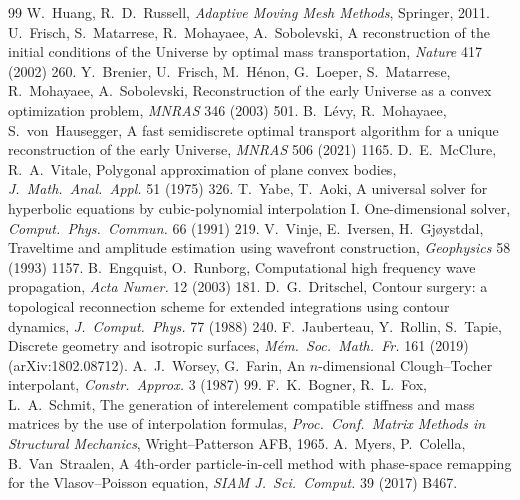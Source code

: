 \documentclass[11pt,a4paper]{article}
\numberwithin{equation}{section}
\theoremstyle{definition}
\theoremstyle{remark}
\begin{document}
\begin{thebibliography}{99}
 W.~Huang, R.~D.~Russell, \emph{Adaptive Moving Mesh Methods}, Springer, 2011.
 U.~Frisch, S.~Matarrese, R.~Mohayaee, A.~Sobolevski, A reconstruction of the initial conditions of the Universe by optimal mass transportation, \emph{Nature} 417 (2002) 260.
 Y.~Brenier, U.~Frisch, M.~H\'enon, G.~Loeper, S.~Matarrese, R.~Mohayaee, A.~Sobolevski, Reconstruction of the early Universe as a convex optimization problem, \emph{MNRAS} 346 (2003) 501.
 B.~L\'evy, R.~Mohayaee, S.~von~Hausegger, A fast semidiscrete optimal transport algorithm for a unique reconstruction of the early Universe, \emph{MNRAS} 506 (2021) 1165.
 D.~E.~McClure, R.~A.~Vitale, Polygonal approximation of plane convex bodies, \emph{J.\ Math.\ Anal.\ Appl.} 51 (1975) 326.
 T.~Yabe, T.~Aoki, A universal solver for hyperbolic equations by cubic-polynomial interpolation I. One-dimensional solver, \emph{Comput.\ Phys.\ Commun.} 66 (1991) 219.
 V.~Vinje, E.~Iversen, H.~Gj{\o}ystdal, Traveltime and amplitude estimation using wavefront construction, \emph{Geophysics} 58 (1993) 1157.
 B.~Engquist, O.~Runborg, Computational high frequency wave propagation, \emph{Acta Numer.} 12 (2003) 181.
 D.~G.~Dritschel, Contour surgery: a topological reconnection scheme for extended integrations using contour dynamics, \emph{J.\ Comput.\ Phys.} 77 (1988) 240.
 F.~Jauberteau, Y.~Rollin, S.~Tapie, Discrete geometry and isotropic surfaces, \emph{M\'em.\ Soc.\ Math.\ Fr.} 161 (2019) (arXiv:1802.08712).
 A.~J.~Worsey, G.~Farin, An $n$-dimensional Clough--Tocher interpolant, \emph{Constr.\ Approx.} 3 (1987) 99.
 F.~K.~Bogner, R.~L.~Fox, L.~A.~Schmit, The generation of interelement compatible stiffness and mass matrices by the use of interpolation formulas, \emph{Proc.\ Conf.\ Matrix Methods in Structural Mechanics}, Wright--Patterson AFB, 1965.
 A.~Myers, P.~Colella, B.~Van~Straalen, A 4th-order particle-in-cell method with phase-space remapping for the Vlasov--Poisson equation, \emph{SIAM J.\ Sci.\ Comput.} 39 (2017) B467.
\end{thebibliography}
\end{document}
